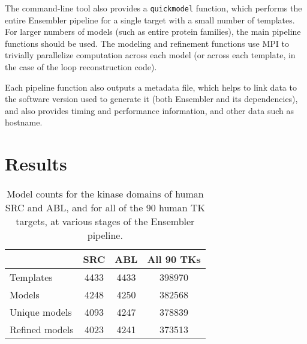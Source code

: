 \documentclass[aps,pre,twocolumn,nofootinbib,superscriptaddress,linenumbers]{revtex4-1}
\begin{document}
The command-line tool also provides a {\tt quickmodel} function, which performs the entire Ensembler pipeline for a single target with a small number of templates.
For larger numbers of models (such as entire protein families), the main pipeline functions should be used.
The modeling and refinement functions use MPI to trivially parallelize computation across each model (or across each template, in the case of the loop reconstruction code).

Each pipeline function also outputs a metadata file, which helps to link data to the software version used to generate it (both Ensembler and its dependencies), and also provides timing and performance information, and other data such as hostname.






\label{section:design}

\section{Results}
\label{section:results}

\begin{table}
\begin{tabular}{l|c|c|c}

    & SRC & ABL & All 90 TKs \\
    \hline
    Templates & \num{4433} & \num{4433} & \num{398970} \\
    Models & \num{4248} & \num{4250} & \num{382568} \\
    Unique models & \num{4093} & \num{4247} & \num{378839} \\
    Refined models & \num{4023} & \num{4241} & \num{373513} \\

\end{tabular}
\label{tab:model_counts}
\caption{Model counts for the kinase domains of human SRC and ABL, and for all of the 90 human TK targets, at various stages of the Ensembler pipeline.}
\end{table}
\end{document}
